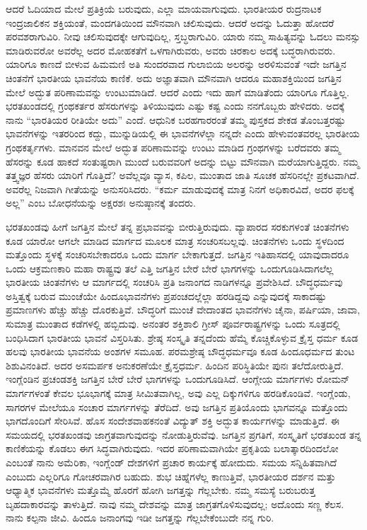 ಆದರೆ ಓದಿಯಾದ ಮೇಲೆ ಪ್ರತಿಕ್ರಿಯೆ ಬರುವುದು, ಎಲ್ಲಾ ಮಾಯವಾಗುವುದು. ಭಾರತೀಯರ ರುದ್ರನಾಟಕ ಇಂದ್ರಜಾಲಿಕನ ಶಕ್ತಿಯಂತೆ, ಮಂದಗತಿಯಿಂದ ಮೌನವಾಗಿ ಚಲಿಸುವುದು. ಆದರೆ ಅದನ್ನು ಓದುತ್ತಾ ಹೋದರೆ ಪರವಶರಾಗುವಿರಿ. ನೀವು ಚಲಿಸುವುದಕ್ಕೇ ಆಗುವುದಿಲ್ಲ, ಸ್ತಬ್ಧರಾಗುವಿರಿ. ಯಾರು ನಮ್ಮ ಸಾಹಿತ್ಯವನ್ನು ಓದಲು ಮನಸ್ಸು ಮಾಡಿರುವರೋ ಅವರೆಲ್ಲ ಅದರ ಮೋಹಕತೆಗೆ ಒಳಗಾಗಿರುವರು, ಅವರು ಚಿರಕಾಲ ಅದಕ್ಕೆ ಬದ್ಧರಾಗಿರುವರು. ಯಾರಿಗೂ ಕಾಣದೆ ಬೀಳುವ ಹಿಮಮಣಿ ಅತಿ ಸುಂದರವಾದ ಗುಲಾಬಿಯ ಅಲರನ್ನು ಅರಳಿಸುವಂತೆ ಇದೇ ಜಗತ್ತಿನ ಚಿಂತನೆಗೆ ಭಾರತೀಯ ಭಾವನೆಯ ಕಾಣಿಕೆ. ಅದು ಅಜ್ಞಾತವಾಗಿ ಮೌನವಾಗಿ ಆದರೂ ಮಹಾಶಕ್ತಿಯಿಂದ ಜಗತ್ತಿನ ಮೇಲೆ ಅದ್ಭುತ ಪರಿಣಾಮವನ್ನು ಉಂಟುಮಾಡಿದೆ. ಆದರೆ ಎಂದು ಇದು ಹಾಗೆ ಮಾಡಿತೆಂದು ಯಾರಿಗೂ ಗೊತ್ತಿಲ್ಲ. ಭರತಖಂಡದಲ್ಲಿ ಗ್ರಂಥಕರ್ತರ ಹೆಸರುಗಳನ್ನು ತಿಳಿಯುವುದು ಎಷ್ಟು ಕಷ್ಟ ಎಂದು ನನಗೊಬ್ಬರು ಹೇಳಿದರು. ಅದಕ್ಕೆ ನಾನು “ಭಾರತಿಯರ ರೀತಿಯೇ ಅದು” ಎಂದೆ. ಆಧುನಿಕ ಬರಹಗಾರರಂತೆ ತಮ್ಮ ಪುಸ್ತಕದ ಶೇಕಡ ತೊಂಬತ್ತರಷ್ಟು ಭಾವನೆಗಳನ್ನು ಇತರರಿಂದ ಕದ್ದು, ಮುನ್ನುಡಿಯಲ್ಲಿ ಈ ಭಾವನೆಗಳೆಲ್ಲಾ ನನ್ನದೇ ಎಂದು ಹೇಳುವಂತವರಲ್ಲ ಭಾರತೀಯ ಗ್ರಂಥಕರ್ತೃಗಳು. ಮಾನವನ ಮೇಲೆ ಅದ್ಭುತ ಪರಿಣಾಮವನ್ನು ಉಂಟು ಮಾಡಿದ ಗ್ರಂಥಗಳನ್ನು ಬರೆದವರು ತಮ್ಮ ಹೆಸರನ್ನು ಕೂಡ ಹಾಕದೆ ಸಂತುಷ್ಟರಾಗಿ ಮುಂದೆ ಬರುವವರಿಗೆ ಅದನ್ನು ಬಿಟ್ಟು ಮೌನವಾಗಿ ಮರೆಯಾಗುತ್ತಿದ್ದರು. ನಮ್ಮ ತತ್ತ್ವಜ್ಞರ ಹೆಸರು ಯಾರಿಗೆ ಗೊತ್ತಿದೆ? ಅವೆಲ್ಲವೂ ವ್ಯಾಸ, ಕಪಿಲ, ಮುಂತಾದ ಜಾತಿ ಸೂಚಕ ಹೆಸರಿನಲ್ಲೇ ಪ್ರಕಟವಾಗಿದೆ. ಅವರೆಲ್ಲ ನಿಜವಾಗಿ ಗೀತೆಯನ್ನು ಅನುಸರಿಸಿದರು. “ಕರ್ಮ ಮಾಡುವುದಕ್ಕೆ ಮಾತ್ರ ನಿನಗೆ ಅಧಿಕಾರವಿದೆ, ಅದರ ಫಲಕ್ಕೆ ಅಲ್ಲ” ಎಂಬ ಬೋಧನೆಯನ್ನು ಅಕ್ಷರಶಃ ಅನುಷ್ಠಾನಕ್ಕೆ ತಂದರು.

ಭರತಖಂಡವು ಹೀಗೆ ಜಗತ್ತಿನ ಮೇಲೆ ತನ್ನ ಪ್ರಭಾವವನ್ನು ಬೀರುತ್ತಿರುವುದು. ವ್ಯಾಪಾರದ ಸರಕುಗಳಂತೆ ಚಿಂತನೆಗಳು ಕೂಡ ಯಾರೋ ಆಗಲೇ ಮಾಡಿದ ಮಾರ್ಗದ ಮೂಲಕ ಮಾತ್ರ ಸಂಚರಿಸಬಲ್ಲವು. ಚಿಂತನೆಗಳು ಒಂದು ಸ್ಥಳದಿಂದ ಮತ್ತೊಂದು ಸ್ಥಳಕ್ಕೆ ಸಂಚರಿಸಬೇಕಾದರೂ ಒಂದು ಮಾರ್ಗ ಬೇಕಾಗುತ್ತದೆ. ಜಗತ್ತಿನ ಇತಿಹಾಸದಲ್ಲಿ ಯಾವುದಾದರೂ ಒಂದು ಆಕ್ರಮಣಕಾರಿ ಮಹಾ ರಾಷ್ಟ್ರವು ತಲೆ ಎತ್ತಿ ಜಗತ್ತಿನ ಬೇರೆ ಬೇರೆ ಭಾಗಗಳನ್ನು ಒಂದುಗೂಡಿಸಿದಾಗಲೆಲ್ಲ ಭಾರತೀಯ ಚಿಂತನೆಗಳು ಆ ಮಾರ್ಗದಲ್ಲಿ ಸಂಚರಿಸಿ ಪ್ರತಿ ಜನಾಂಗದ ನಾಡಿಗಳನ್ನೂ ಪ್ರವೇಶಿಸಿದೆ. ಬೌದ್ಧಧರ್ಮವು ಅಸ್ತಿತ್ವಕ್ಕೆ ಬರುವ ಮುಂಚೆಯೇ ಹಿಂದೂಭಾವನೆಗಳು ಪ್ರಪಂಚದಲ್ಲೆಲ್ಲಾ ಹರಡಿದ್ದವು ಎನ್ನುವುದಕ್ಕೆ ಸಾಕಾದಷ್ಟು ಪ್ರಮಾಣಗಳು ಹೆಚ್ಚು ಹೆಚ್ಚು ದೊರಕುತ್ತಿವೆ. ಬೌದ್ಧರಿಗೆ ಮುಂಚೆ ವೇದಾಂತದ ಭಾವನೆಗಳು ಚೈನಾ, ಪರ್ಷಿಯಾ, ಜಾವಾ, ಸುಮಾತ್ರ ಮುಂತಾದ ಕಡೆಗಳಲ್ಲಿ ಹಬ್ಬಿದುವು. ಅನಂತರ ಶಕ್ತಿಶಾಲಿ ಗ್ರೀಸ್​ ಪೂರ್ವರಾಷ್ಟ್ರಗಳನ್ನು ಒಂದು ಸೂತ್ರದಲ್ಲಿ ಬಂಧಿಸಿದಾಗ ಭಾರತೀಯ ಭಾವನೆ ವಿಸ್ತರಿಸಿತು. ಶ್ರೇಷ್ಠ ಸಂಸ್ಕೃತಿ ತನ್ನದೆಂದು ಹೆಮ್ಮೆ ಕೊಚ್ಚಿಕೊಳ್ಳುವ ಕ್ರೈಸ್ತ ಧರ್ಮ ಕೂಡ ಹಲವು ಭಾರತೀಯ ಭಾವನೆಯ ಅಂಶಗಳ ಸಮೂಹ. ಪರಮಶ್ರೇಷ್ಠ ಬೌದ್ಧಧರ್ಮವೂ ಕೂಡ ಹಿಂದೂಧರ್ಮದ ತುಂಟ ಶಿಶುವಿನಂತಿದೆ. ಅದರ ಅಸಮರ್ಪಕ ಅನುಕರಣೆಯೇ ಕ್ರೈಸ್ತಧರ್ಮ. ಹಿಂದಿನ ಪರಿಸ್ಥಿತಿಯೇ ಪುನಃ ತಲೆದೋರುತ್ತಿದೆ. ಇಂಗ್ಲೆಂಡಿನ ಪ್ರಚಂಡಶಕ್ತಿ ಜಗತ್ತಿನ ಬೇರೆ ಬೇರೆ ಭಾಗಗಳನ್ನು ಒಂದುಗೂಡಿಸಿದೆ. ಆಂಗ್ಲೇಯ ಮಾರ್ಗಗಳು ರೋಮನ್​ ಮಾರ್ಗಗಳಂತೆ ಕೇವಲ ಭೂಭಾಗಕ್ಕೆ ಮಾತ್ರ ಸೀಮಿತವಾಗಿಲ್ಲ, ಅವು ಎಲ್ಲ ದಿಕ್ಕುಗಳಿಗೂ ಹರಡಿಕೊಂಡಿವೆ. ಇಂಗ್ಲೆಂಡು, ಸಾಗರಗಳ ಮೇಲೆಯೂ ಸಂಚಾರ ಮಾರ್ಗಗಳನ್ನು ತೆರೆದಿದೆ. ಅವು ಜಗತ್ತಿನ ಪ್ರತಿಯೊಂದು ಭಾಗವನ್ನೂ ಮತ್ತೊಂದು ಭಾಗದೊಂದಿಗೆ ಸೇರಿಸಿವೆ. ಹೊಸ ಸಂದೇಶವಾಹಕನಂತೆ ವಿದ್ಯುತ್​ ಶಕ್ತಿ ಅದ್ಭುತ ಕಾರ್ಯಗಳನ್ನು ಮಾಡುತ್ತಿದೆ. ಈ ಸಮಯದಲ್ಲಿ ಭರತಖಂಡವು ಜಾಗ್ರತವಾಗುವುದನ್ನು ನೋಡುತ್ತಿರುವೆವು. ಜಗತ್ತಿನ ಪ್ರಗತಿಗೆ, ಸಂಸ್ಕೃತಿಗೆ ಭರತಖಂಡ ತನ್ನ ಕಾಣಿಕೆಯನ್ನು ಕೊಡಲು ಈಗ ಸಿದ್ಧವಾಗಿರುವುದು. ಇದರ ಪರಿಣಾಮವಾಗಿಯೇ ಪ್ರಕೃತಿಯ ಬಲಾತ್ಕಾರದಿಂದಲೋ ಎಂಬಂತೆ ನಾನು ಅಮೆರಿಕಾ, ಇಂಗ್ಲೆಂಡ್​ ದೇಶಗಳಿಗೆ ಪ್ರಚಾರ ಕಾರ್ಯಕ್ಕೆ ಹೋದುದು. ಸಮಯ ಸನ್ನಿಹಿತವಾಗಿದೆ ಎಂಬುದು ಎಲ್ಲರಿಗೂ ಗೋಚರವಾಗಿರ ಬಹುದು. ಶುಭ ಚಿಹ್ನೆಗಳೆಲ್ಲ ಕಾಣುತ್ತಿವೆ, ಭಾರತೀಯರ ದರ್ಶನ ಮತ್ತು ಆಧ್ಯಾತ್ಮಿಕ ಭಾವನೆಗಳು ಮತ್ತೊಮ್ಮೆ ಹೊರಗೆ ಹೋಗಿ ಜಗತ್ತನ್ನು ಗೆಲ್ಲಬೇಕು. ನಮ್ಮ ಸಮಸ್ಯೆ ಬರುಬರುತ್ತ ಬೃಹದಾಕಾರವನ್ನು ತಾಳುತ್ತಿದೆ. ನಾವು ನಮ್ಮ ದೇಶವನ್ನು ಮಾತ್ರ ಜಾಗ್ರತಗೊಳಿಸುವುದಲ್ಲ; ಅದೊಂದು ಸಣ್ಣ ಕೆಲಸ. ನಾನು ಕಲ್ಪನಾ ಜೀವಿ. ಹಿಂದೂ ಜನಾಂಗವು ಇಡೀ ಜಗತ್ತನ್ನು ಗೆಲ್ಲಬೇಕೆಂಬುದೇ ನನ್ನ ಗುರಿ.

